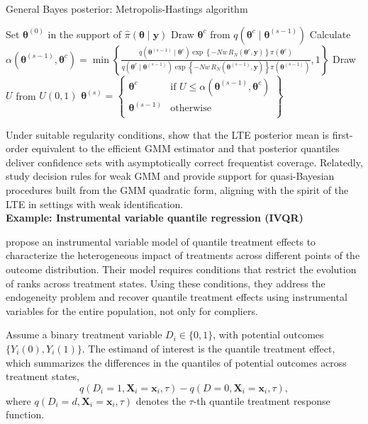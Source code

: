\begin{algorithm}[h!]
	\caption{General Bayes posterior: Metropolis-Hastings algorithm}\label{Alg:GibbsPosteior}
	\begin{algorithmic}[1]
		\State Set $\bm{\theta}^{(0)}$ in the support of $\hat{\pi}(\bm{\theta}\mid \bm{y})$  		 			
		\State Draw $\bm{\theta}^{c}$ from $q(\bm{\theta}^{c}\mid \bm{\theta}^{(s-1)})$
		\State Calculate $\alpha(\bm{\theta}^{(s-1)}, \bm{\theta}^{c}) = 
		\min\left\{\frac{q(\bm{\theta}^{(s-1)} \mid  \bm{\theta}^{c}) \exp\left\{-Nw\,R_N(\boldsymbol{\theta}^c,\mathbf{y})\right\}\pi(\boldsymbol{\theta}^c)}{q(\bm{\theta}^{c} \mid  \bm{\theta}^{(s-1)}) \exp\left\{-Nw\,R_N(\boldsymbol{\theta}^{(s-1)},\mathbf{y})\right\}\pi(\boldsymbol{\theta}^{(s-1)})}, 1\right\}$
		\State Draw $U$ from $U(0,1)$
		\State $\bm{\theta}^{(s)}=\begin{Bmatrix}
			\bm{\theta}^{c} & \text{if } U\leq \alpha(\bm{\theta}^{(s-1)}, \bm{\theta}^{c})\\
			\bm{\theta}^{(s-1)} & \text{otherwise}\\
		\end{Bmatrix}$
		\EndFor 
	\end{algorithmic} 
\end{algorithm}


Under suitable regularity conditions, \cite{chernozhukov2003mcmc} show that the LTE posterior mean is first-order equivalent to the efficient GMM estimator and that posterior quantiles deliver confidence sets with asymptotically correct frequentist coverage. Relatedly, \cite{andrews2022weakgmm} study decision rules for weak GMM and provide support for quasi-Bayesian procedures built from the GMM quadratic form, aligning with the spirit of the LTE in settings with weak identification.\\

\textbf{Example: Instrumental variable quantile regression (IVQR)}

\cite{Chernozhukov2005} propose an instrumental variable model of quantile treatment effects to characterize the heterogeneous impact of treatments across different points of the outcome distribution. Their model requires conditions that restrict the evolution of ranks across treatment states. Using these conditions, they address the endogeneity problem and recover quantile treatment effects using instrumental variables for the entire population, not only for compliers.  

Assume a binary treatment variable $D_i\in\{0,1\}$, with potential outcomes $\{Y_i(0),Y_i(1)\}$. The estimand of interest is the quantile treatment effect, which summarizes the differences in the quantiles of potential outcomes across treatment states,
\[
q(D_i=1,\mathbf{X}_i=\mathbf{x}_i,\tau)-q(D=0,\mathbf{X}_i=\mathbf{x}_i,\tau),
\] 
where $q(D_i=d,\mathbf{X}_i=\mathbf{x}_i,\tau)$ denotes the $\tau$-th quantile treatment response function.  

